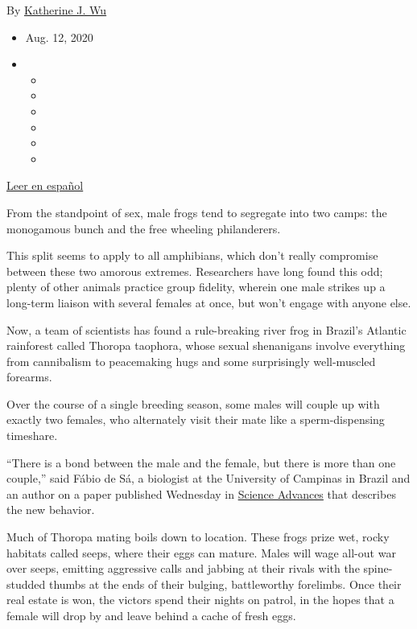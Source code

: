 By
\href{https://www.nytimes3xbfgragh.onion/by/katherine-j--wu}{Katherine
J. Wu}

\begin{itemize}
\item
  Aug. 12, 2020
\item
  \begin{itemize}
  \item
  \item
  \item
  \item
  \item
  \item
  \end{itemize}
\end{itemize}

\href{https://www.nytimes3xbfgragh.onion/es/2020/08/12/espanol/ciencia-y-tecnologia/ranas-brasil.html}{Leer
en español}

From the standpoint of sex, male frogs tend to segregate into two camps:
the monogamous bunch and the free wheeling philanderers.

This split seems to apply to all amphibians, which don't really
compromise between these two amorous extremes. Researchers have long
found this odd; plenty of other animals practice group fidelity, wherein
one male strikes up a long-term liaison with several females at once,
but won't engage with anyone else.

Now, a team of scientists has found a rule-breaking river frog in
Brazil's Atlantic rainforest called Thoropa taophora, whose sexual
shenanigans involve everything from cannibalism to peacemaking hugs and
some surprisingly well-muscled forearms.

Over the course of a single breeding season, some males will couple up
with exactly two females, who alternately visit their mate like a
sperm-dispensing timeshare.

``There is a bond between the male and the female, but there is more
than one couple,'' said Fábio de Sá, a biologist at the University of
Campinas in Brazil and an author on a paper published Wednesday in
\href{https://advances.sciencemag.org/lookup/doi/10.1126/sciadv.aay1539}{Science
Advances} that describes the new behavior.

Much of Thoropa mating boils down to location. These frogs prize wet,
rocky habitats called seeps, where their eggs can mature. Males will
wage all-out war over seeps, emitting aggressive calls and jabbing at
their rivals with the spine-studded thumbs at the ends of their bulging,
battleworthy forelimbs. Once their real estate is won, the victors spend
their nights on patrol, in the hopes that a female will drop by and
leave behind a cache of fresh eggs.

